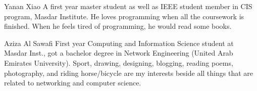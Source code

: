 \documentclass[journal]{IEEEtran}
\begin{document}
\begin{IEEEbiographynophoto}{Yanan Xiao}
A first year master student as well as IEEE student member in CIS program, Masdar Institute. He loves programming when all the coursework is finished. When he feels tired of programming, he would read some books.
\end{IEEEbiographynophoto}


\begin{IEEEbiographynophoto}{Aziza Al Sawafi}
 First year Computing and Information Science student at Masdar Inst., got a bachelor degree in Network Engineering (United Arab Emirates University). Sport, drawing, designing, blogging, reading poems, photography, and riding horse/bicycle are my interests beside all things that are related to networking and computer science.
\end{IEEEbiographynophoto}


\vfill

\enlargethispage{-5in}



\end{document}
